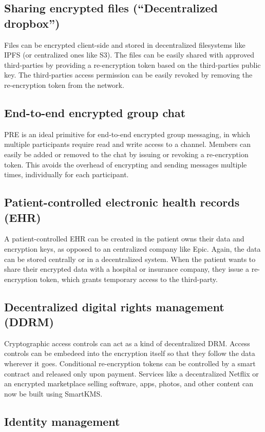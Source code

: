 \documentclass[notitlepage,longbibliography]{revtex4-1}
\newcommand{\kms}{SmartKMS}
\begin{document}
\subsection{Sharing encrypted files (``Decentralized dropbox'')}
Files can be encrypted client-side and stored in decentralized filesystems like IPFS (or centralized ones like S3).
The files can be easily shared with approved third-parties by providing a re-encryption token based on the third-parties
public key.
The third-parties access permission can be easily revoked by removing the re-encryption token from the network.

\subsection{End-to-end encrypted group chat}
PRE is an ideal primitive for end-to-end encrypted group messaging, in which multiple participants require read and write
access to a channel. Members can easily be added or removed to the chat by issuing or revoking a re-encryption token.
This avoids the overhead of encrypting and sending messages multiple times, individually for each participant.

\subsection{Patient-controlled electronic health records (EHR)}
A patient-controlled EHR can be created in the patient owns their data and encryption keys, as opposed to an centralized
company like Epic.
Again, the data can be stored centrally or in a decentralized system.
When the patient wants to share their encrypted data with a hospital or insurance company, they issue a re-encryption token,
which grants temporary access to the third-party.

\subsection{Decentralized digital rights management (DDRM)}
Cryptographic access controls can act as a kind of decentralized DRM.
Access controls can be embedeed into the encryption itself so that they follow the data wherever it goes.
Conditional re-encryption tokens can be controlled by a smart contract and released only upon payment.
Services like a decentralized Netflix or an encrypted marketplace selling software, apps, photos, and other content
can now be built using \kms.

\subsection{Identity management}
\end{document}
